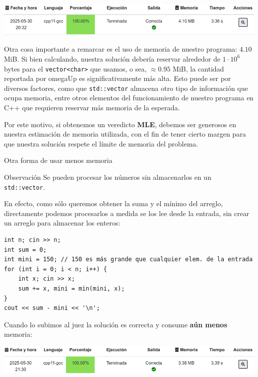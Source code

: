 \documentclass{beamer}
\begin{document}
    \begin{frame}[noframenumbering]
        \begin{center}
            \includegraphics[width=.9\linewidth]{./ou_problem_ac_char.png}
        \end{center}

        Otra cosa importante a remarcar es el uso de memoria de nuestro programa: $4.10$ MiB. \pause Si bien calculando, nuestra solución debería reservar alrededor de $1 \cdot 10^6$ bytes para el \texttt{vector<char>} que usamos, o sea, $\approx 0.95$ MiB, la cantidad reportada por omegaUp es significativamente más alta. \pause Esto puede ser por diversos factores, como que \texttt{std::vector} almacena otro tipo de información que ocupa memoria, entre otros elementos del funcionamiento de nuestro programa en C++ que requieren reservar más memoria de la esperada. \pause

        Por este motivo, si obtenemos un veredicto \textbf{MLE}, debemos ser generosos en nuestra estimación de memoria utilizada, con el fin de tener cierto margen para que nuestra solución respete el límite de memoria del problema.
    \end{frame}

    \begin{frame}[fragile]{Otra forma de usar menos memoria}
        \pause
        \begin{block}{Observación}
            Se pueden procesar los números sin almacenarlos en un \texttt{std::vector}.
        \end{block} \pause
        En efecto, como sólo queremos obtener la suma y el mínimo del arreglo, directamente podemos procesarlos a medida se los lee desde la entrada, sin crear un arreglo para almacenar los enteros:\pause

        \begin{verbatim}
int n; cin >> n;
int sum = 0;
int mini = 150; // 150 es más grande que cualquier elem. de la entrada
for (int i = 0; i < n; i++) {
    int x; cin >> x;
    sum += x, mini = min(mini, x);
}
cout << sum - mini << '\n';
        \end{verbatim}
        \pause

        Cuando lo subimos al juez la solución es correcta y consume \textbf{aún menos} memoria: \pause
        \begin{center}
            \includegraphics[width=.8\linewidth]{./ou_problem_ac_novec.png}
        \end{center}
    \end{frame}
\end{document}
